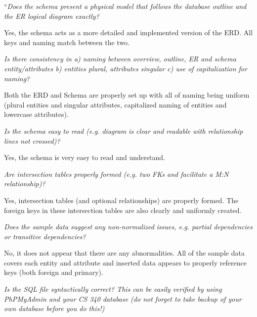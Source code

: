 \documentclass{article}
\begin{document}
\begin{tcolorbox}[colback=secondarycolor, colframe=primarycolor, title=\textbf{Step 2: Peer Review 1 - Joseph Gilmore}]
``\textit{Does the schema present a physical model that follows the database outline and the ER logical diagram exactly?}

\vspace{0.05cm}
Yes, the schema acts as a more detailed and implemented version of the ERD. All keys and naming match between the two.

\vspace{0.2cm}
\textit{Is there consistency in a) naming between overview, outline, ER and schema entity/attributes b) entities plural, attributes singular c) use of capitalization for naming?}

\vspace{0.05cm}
Both the ERD and Schema are properly set up with all of naming being uniform (plural entities and singular attributes, capitalized naming of entities and lowercase attributes).

\vspace{0.2cm}
\textit{Is the schema easy to read (e.g. diagram is clear and readable with relationship lines not crossed)?}

\vspace{0.05cm}
Yes, the schema is very easy to read and understand.

\vspace{0.2cm}
\textit{Are intersection tables properly formed (e.g. two FKs and facilitate a M:N relationship)?}

\vspace{0.05cm}
Yes, intersection tables (and optional relationships) are properly formed. The foreign keys in these intersection tables are also clearly and uniformly created.

\vspace{0.2cm}
\textit{Does the sample data suggest any non-normalized issues, e.g. partial dependencies or transitive dependencies?}

\vspace{0.05cm}
No, it does not appear that there are any abnormalities. All of the sample data covers each entity and attribute and inserted data appears to properly reference keys (both foreign and primary).

\vspace{0.2cm}
\textit{Is the SQL file syntactically correct? This can be easily verified by using PhPMyAdmin and your CS 340 database (do not forget to take backup of your own database before you do this!)}


\end{tcolorbox}
\end{document}
